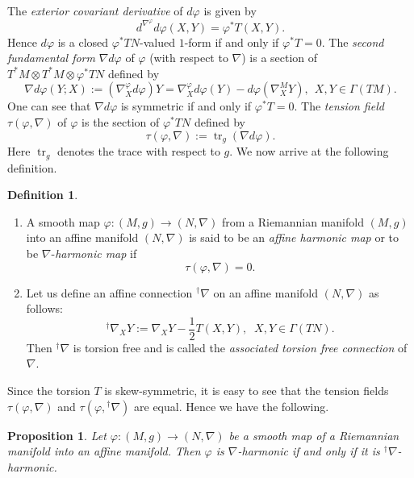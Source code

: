 \documentclass[12pt]{amsart}
\newtheorem{Proposition}[Theorem]{Proposition}
\theoremstyle{definition}
\newtheorem{Definition}{Definition}[section]
\theoremstyle{remark}
\numberwithin{equation}{section}
\begin{document}
 The \textit{exterior covariant derivative} of $d\varphi$ is given by
\begin{equation*}
 d^{\nabla^\varphi}d\varphi(X,Y)=\varphi^{*}T(X,Y).
\end{equation*}
 Hence $d\varphi$ is a closed $\varphi^{*}TN$-valued $1$-form 
 if and only if $\varphi^{*}T=0$.
 The \textit{second fundamental form} $\nabla{d}\varphi$ 
 of $\varphi$ (with respect to $\nabla$) is 
 a section of $T^* M \otimes T^* M  \otimes \varphi^* TN$
 defined by
\begin{equation}
\nabla{d}\varphi (Y; X):=
(\nabla^{\varphi}_{X}d\varphi)Y
=\nabla^{\varphi}_{X}{d}\varphi(Y)-{d}\varphi(\nabla^{M}_{X}Y),
\ \
X,Y \in \varGamma (TM).
\end{equation}
 One can see that $\nabla d\varphi$ 
 is symmetric if and only if $\varphi^{*}T=0$.
 The \textit{tension field} $\tau(\varphi, \nabla)$ of $\varphi$ 
 is the  section of 
 $\varphi^{*}TN$ defined by 
\begin{equation*}
 \tau(\varphi, \nabla) := {\operatorname {tr}_g} (\nabla{d}\varphi).
\end{equation*}
 Here ${\operatorname {tr}_g}$ denotes the trace with respect to $g$.
 We now arrive at the following definition.
\begin{Definition}
\mbox{}
\begin{enumerate}
\item  A smooth map $\varphi:(M,g)\to (N,\nabla)$ from 
 a Riemannian manifold $(M,g)$
 into an affine manifold $(N,\nabla)$ is said to be an 
 \textit{affine harmonic map} or to be 
 $\nabla$-\textit{harmonic map}
 if 
 \begin{equation*}
 \tau(\varphi, \nabla)=0.
 \end{equation*}
 
\item Let us define an affine connection 
 ${}^\dag\nabla$ on an affine manifold $(N,\nabla)$ as follows:
 \begin{equation*}
 {}^\dag\nabla_{X}Y:=\nabla_{X}Y-\frac{1}{2}T(X,Y),\;\;
 X, Y \in \varGamma(TN).
 \end{equation*}
 Then ${}^\dag\nabla$ is torsion free and is called the 
 \textit{associated torsion free connection} of $\nabla$.
\end{enumerate}
\end{Definition}
 Since the torsion $T$ is skew-symmetric, it is easy to see 
 that the tension fields 
 $\tau(\varphi, \nabla)$ and 
 $\tau(\varphi, {}^{\dag}\nabla)$ are equal.
 Hence we have the following.
\begin{Proposition}\label{associatedtorsionfree}
 Let $\varphi:(M,g)\to (N,\nabla)$ be a smooth 
 map of a Riemannian manifold into an affine manifold. Then 
 $\varphi$ is $\nabla$-harmonic if and only if 
 it is ${}^\dag\nabla$-harmonic.
\end{Proposition}
\end{document}
